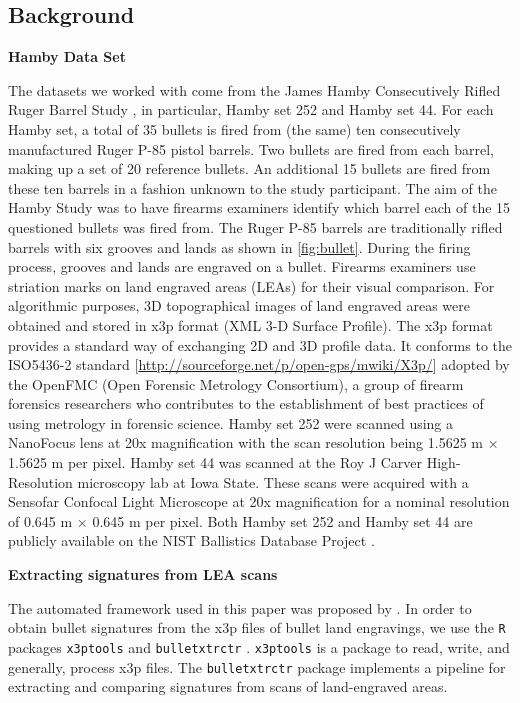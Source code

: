 \hypertarget{background}{%
\subsection{Background}\label{background}}

\textbf{Hamby Data Set}

The datasets we worked with come from the James Hamby Consecutively
Rifled Ruger Barrel Study \citep{brundage, hamby, Hamby:2019}, in
particular, Hamby set 252 and Hamby set 44. For each Hamby set, a total
of 35 bullets is fired from (the same) ten consecutively manufactured
Ruger P-85 pistol barrels. Two bullets are fired from each barrel,
making up a set of 20 reference bullets. An additional 15 bullets are
fired from these ten barrels in a fashion unknown to the study
participant. The aim of the Hamby Study was to have firearms examiners
identify which barrel each of the 15 questioned bullets was fired from.
The Ruger P-85 barrels are traditionally rifled barrels with six grooves
and lands as shown in \autoref{fig:bullet}. During the firing process,
grooves and lands are engraved on a bullet. Firearms examiners use
striation marks on land engraved areas (LEAs) for their visual
comparison. For algorithmic purposes, 3D topographical images of land
engraved areas were obtained and stored in x3p format (XML 3-D Surface
Profile). The x3p format provides a standard way of exchanging 2D and 3D
profile data. It conforms to the ISO5436-2 standard
{[}\url{http://sourceforge.net/p/open-gps/mwiki/X3p/}{]} adopted by the
OpenFMC (Open Forensic Metrology Consortium), a group of firearm
forensics researchers who contributes to the establishment of best
practices of using metrology in forensic science. Hamby set 252 were
scanned using a NanoFocus lens at 20x magnification with the scan
resolution being 1.5625 \textmu m \(\times\) 1.5625 \textmu m per pixel.
Hamby set 44 was scanned at the Roy J Carver High-Resolution microscopy
lab at Iowa State. These scans were acquired with a Sensofar Confocal
Light Microscope at 20x magnification for a nominal resolution of 0.645
\textmu m \(\times\) 0.645 \textmu m per pixel. Both Hamby set 252 and
Hamby set 44 are publicly available on the NIST Ballistics Database
Project \citep{nistdb}.

\textbf{Extracting signatures from LEA scans}

The automated framework used in this paper was proposed by \citet{aoas}.
In order to obtain bullet signatures from the x3p files of bullet land
engravings, we use the \texttt{R} packages \texttt{x3ptools}
\citep{x3ptools} and \texttt{bulletxtrctr} \citep{bulletxtrctr}.
\texttt{x3ptools} is a package to read, write, and generally, process
x3p files. The \texttt{bulletxtrctr} package implements a pipeline for
extracting and comparing signatures from scans of land-engraved areas.

